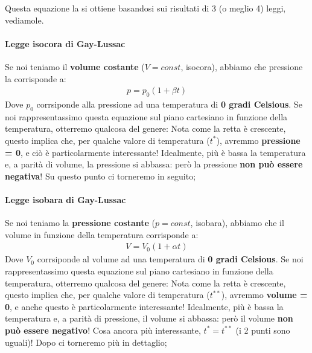                 Questa equazione la si ottiene basandosi sui risultati di 3 (o meglio 4) leggi, vediamole.
                \paragraph{Legge isocora di Gay-Lussac}
                    Se noi teniamo il \textbf{volume costante} ($V=const$, isocora), abbiamo che pressione la corrisponde a:
                    \begin{align*}
                        p=p_0(1+\beta t)
                    \end{align*}
                    Dove $p_0$ corrsiponde alla pressione ad una temperatura di \textbf{0 gradi Celsious}. Se noi rappresentassimo questa equazione sul piano cartesiano in funzione della temperatura, otterremo qualcosa del genere:
                    Nota come la retta è crescente, questo implica che, per qualche valore di temperatura ($t^*$), avremmo \textbf{pressione = 0}, e ciò è particolarmente interessante! Idealmente, più è bassa la temperatura e, a parità di volume, la pressione si abbassa: però la pressione \textbf{non può essere negativa}! Su questo punto ci torneremo in seguito;
                \paragraph{Legge isobara di Gay-Lussac}
                    Se noi teniamo la \textbf{pressione costante} ($p=const$, isobara), abbiamo che il volume in funzione della temperatura corrisponde a:
                    \begin{align*}
                        V=V_0(1+\alpha t)
                    \end{align*}
                    Dove $V_0$ corrsiponde al volume ad una temperatura di \textbf{0 gradi Celsious}. Se noi rappresentassimo questa equazione sul piano cartesiano in funzione della temperatura, otterremo qualcosa del genere:
                    Nota come la retta è crescente, questo implica che, per qualche valore di temperatura ($t^{**}$), avremmo \textbf{volume = 0}, e anche questo è particolarmente interessante! Idealmente, più è bassa la temperatura e, a parità di pressione, il volume si abbassa: però il volume \textbf{non può essere negativo}! Cosa ancora più interessante, $t^* = t^{**}$ (i 2 punti sono uguali)! Dopo ci torneremo più in dettaglio;
